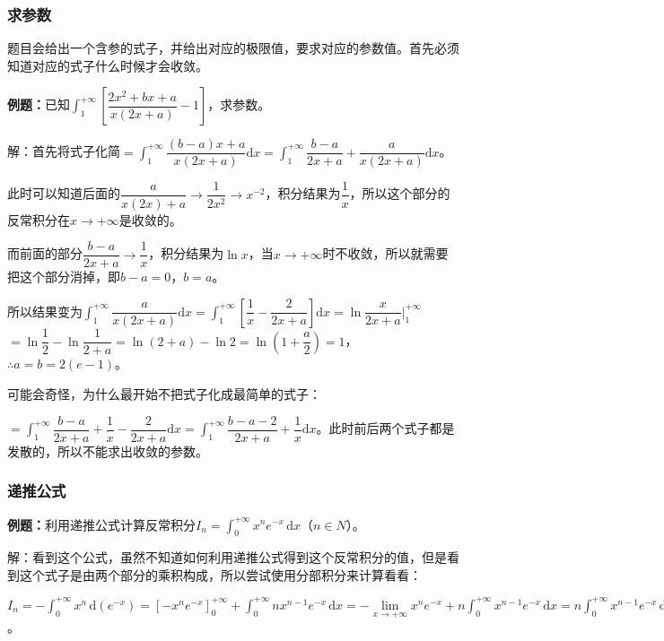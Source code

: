 \documentclass[UTF8, 12pt]{ctexart}
\begin{document}
\subsubsection{求参数}

题目会给出一个含参的式子，并给出对应的极限值，要求对应的参数值。首先必须知道对应的式子什么时候才会收敛。

\textbf{例题：}已知$\displaystyle{\int_1^{+\infty}\left[\dfrac{2x^2+bx+a}{x(2x+a)}-1\right]}$，求参数。

解：首先将式子化简$=\displaystyle{\int_1^{+\infty}\dfrac{(b-a)x+a}{x(2x+a)}\textrm{d}x=\int_1^{+\infty}\dfrac{b-a}{2x+a}+\dfrac{a}{x(2x+a)}\textrm{d}x}$。

此时可以知道后面的$\dfrac{a}{x(2x)+a}\to\dfrac{1}{2x^2}\to x^{-2}$，积分结果为$\dfrac{1}{x}$，所以这个部分的反常积分在$x\to+\infty$是收敛的。

而前面的部分$\dfrac{b-a}{2x+a}\to\dfrac{1}{x}$，积分结果为$\ln x$，当$x\to+\infty$时不收敛，所以就需要把这个部分消掉，即$b-a=0$，$b=a$。

所以结果变为$\displaystyle{\int_1^{+\infty}\dfrac{a}{x(2x+a)}\textrm{d}x=\int_1^{+\infty}\left[\dfrac{1}{x}-\dfrac{2}{2x+a}\right]\textrm{d}x}=\ln\dfrac{x}{2x+a}\bigg\vert_1^{+\infty}$\\$=\ln\dfrac{1}{2}-\ln\dfrac{1}{2+a}=\ln(2+a)-\ln2=\ln\left(1+\dfrac{a}{2}\right)=1$，$\therefore a=b=2(e-1)$。

可能会奇怪，为什么最开始不把式子化成最简单的式子：

$=\displaystyle{\int_1^{+\infty}\dfrac{b-a}{2x+a}+\dfrac{1}{x}-\dfrac{2}{2x+a}\textrm{d}x=\int_1^{+\infty}\dfrac{b-a-2}{2x+a}+\dfrac{1}{x}\textrm{d}x}$。此时前后两个式子都是发散的，所以不能求出收敛的参数。

\subsubsection{递推公式}

\textbf{例题：}利用递推公式计算反常积分$I_n=\int_0^{+\infty}x^ne^{-x}\,\textrm{d}x$（$n\in N$）。

解：看到这个公式，虽然不知道如何利用递推公式得到这个反常积分的值，但是看到这个式子是由两个部分的乘积构成，所以尝试使用分部积分来计算看看：

$I_n=-\int_0^{+\infty}x^n\,\textrm{d}(e^{-x})=[-x^ne^{-x}]_0^{+\infty}+\int_0^{+\infty}nx^{n-1}e^{-x}\,\textrm{d}x=-\lim\limits_{x\to+\infty}x^ne^{-x}+n\int_0^{+\infty}x^{n-1}e^{-x}\,\textrm{d}x=n\int_0^{+\infty}x^{n-1}e^{-x}\,\textrm{d}x=nI_{n-1}$。
\end{document}
